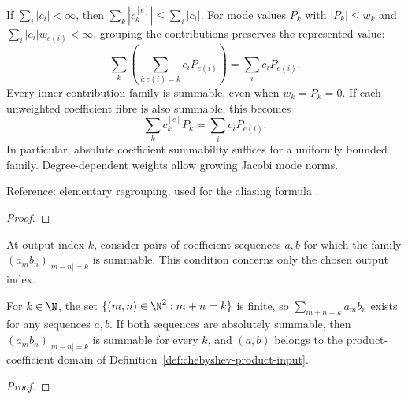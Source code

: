 \begin{supporting}
\begin{theorem}
\label{thm:series-regrouping}
\leanok
If $\sum_i|c_i|<\infty$, then $\sum_k|c^{[e]}_k|\le\sum_i|c_i|$.
For mode values $P_k$ with $|P_k|\le w_k$ and
$\sum_i|c_i|w_{e(i)}<\infty$, grouping the contributions preserves the represented value:
\[
 \sum_k\left(\sum_{i:e(i)=k}c_iP_{e(i)}\right)=\sum_i c_iP_{e(i)}.
\]
Every inner contribution family is summable, even when $w_k=P_k=0$.
If each unweighted coefficient fibre is also summable, this becomes
\[
 \sum_k c^{[e]}_kP_k=\sum_i c_iP_{e(i)}.
\]
In particular, absolute coefficient summability suffices for a uniformly bounded
family. Degree-dependent weights allow growing Jacobi mode norms.

Reference: elementary regrouping, used for the aliasing formula \cite[Theorem 4.2]{atap}.
\end{theorem}
\begin{proof}
\leanok
\end{proof}

\begin{definition}
\label{def:chebyshev-product-input}
\leanok
At output index $k$, consider pairs of coefficient sequences $a,b$ for which the family $(a_mb_n)_{|m-n|=k}$ is summable.
This condition concerns only the chosen output index.
\end{definition}

\begin{theorem}
\label{thm:chebyshev-product-input}
\leanok
For $k\in\N$, the set $\{(m,n)\in\N^2:m+n=k\}$ is finite, so
$\sum_{m+n=k}a_mb_n$ exists for any sequences $a,b$.
If both sequences are absolutely summable, then
$(a_mb_n)_{|m-n|=k}$ is summable for every $k$, and $(a,b)$ belongs to
the product-coefficient domain of Definition~\ref{def:chebyshev-product-input}.
\end{theorem}
\begin{proof}
\leanok
\end{proof}


\end{supporting}
